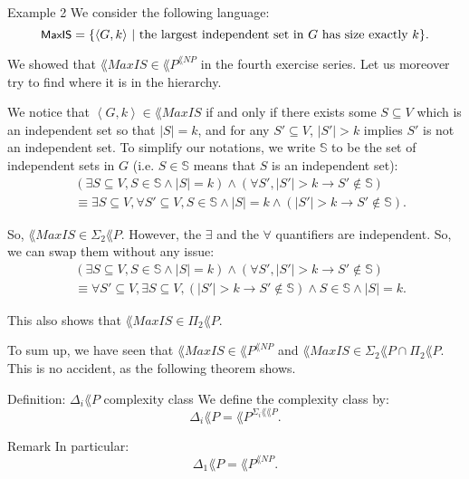 \documentclass[a4paper]{article}
\begin{document}
\begin{parag}{Example 2}
    We consider the following language: 
    \[\lang{MaxIS} = \left\{\left\langle G, k \right\rangle \suchthat \text{the largest independent set in $G$ has size exactly $k$}\right\}.\]

    We showed that $\lang{MaxIS} \in \lang{P}^{\lang{NP}}$ in the fourth exercise series. Let us moreover try to find where it is in the hierarchy.

    We notice that $\left\langle G, k \right\rangle \in \lang{MaxIS}$ if and only if there exists some $S \subseteq V$ which is an independent set so that $\left|S\right| = k$, and for any $S' \subseteq V$, $\left|S'\right| > k$ implies $S'$ is not an independent set. To simplify our notations, we write $\mathbb{S}$ to be the set of independent sets in $G$ (i.e. $S \in \mathbb{S}$ means that $S$ is an independent set):
    \[\begin{split}
        & \left(\exists S \subseteq V, S \in \mathbb{S} \land \left|S\right| = k\right) \land \left(\forall S', \left|S'\right| > k \to S' \not\in \mathbb{S}\right) \\
        & \equiv \exists S \subseteq V, \forall S' \subseteq V, S \in \mathbb{S} \land \left|S\right| = k \land \left(\left|S'\right| > k \to S' \not \in \mathbb{S}\right).
    \end{split}\]

    So, $\lang{MaxIS} \in \Sigma_2 \lang{P}$. However, the $\exists$ and the $\forall$ quantifiers are independent. So, we can swap them without any issue:
    \[\begin{split}
        & \left(\exists S \subseteq V, S \in \mathbb{S} \land \left|S\right| = k\right) \land \left(\forall S', \left|S'\right| > k \to S' \not\in \mathbb{S}\right) \\
        & \equiv \forall S' \subseteq V, \exists S \subseteq V, \left(\left|S'\right| > k \to S' \not \in \mathbb{S}\right) \land S \in \mathbb{S} \land \left|S\right| = k.
    \end{split}\]

    This also shows that $\lang{MaxIS} \in \Pi_2 \lang{P}$.

    To sum up, we have seen that $\lang{MaxIS} \in \lang{P}^{\lang{NP}}$ and $\lang{MaxIS} \in \Sigma_2 \lang{P} \cap \Pi_2 \lang{P}$. This is no accident, as the following theorem shows.
\end{parag}

\begin{parag}{Definition: $\Delta_i \lang{P}$ complexity class}
    We define the  complexity class by: 
    \[\Delta_i \lang{P} = \lang{P}^{\Sigma_i \lang{\lang{P}}}.\]

    \begin{subparag}{Remark}
        In particular: 
        \[\Delta_1 \lang{P} = \lang{P}^{\lang{NP}}.\]
    \end{subparag}
\end{parag}
\end{document}
